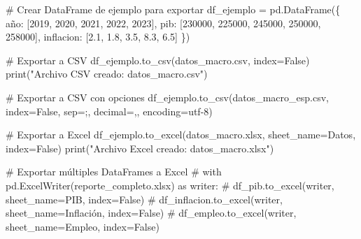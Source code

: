 \documentclass[
  doc,
  floatsintext,
  longtable,
  a4paper,
  nolmodern,
  notxfonts,
  notimes,
  12pt,
  colorlinks=true,linkcolor=blue,citecolor=blue,urlcolor=blue]{apa7}
\newenvironment{Shaded}{\begin{snugshade}}{\end{snugshade}}
\newcommand{\BuiltInTok}[1]{\textcolor[rgb]{0.00,0.23,0.31}{#1}}
\newcommand{\CommentTok}[1]{\textcolor[rgb]{0.37,0.37,0.37}{#1}}
\newcommand{\DecValTok}[1]{\textcolor[rgb]{0.68,0.00,0.00}{#1}}
\newcommand{\FloatTok}[1]{\textcolor[rgb]{0.68,0.00,0.00}{#1}}
\newcommand{\NormalTok}[1]{\textcolor[rgb]{0.00,0.23,0.31}{#1}}
\newcommand{\OperatorTok}[1]{\textcolor[rgb]{0.37,0.37,0.37}{#1}}
\newcommand{\StringTok}[1]{\textcolor[rgb]{0.13,0.47,0.30}{#1}}
\newcommand{\VariableTok}[1]{\textcolor[rgb]{0.07,0.07,0.07}{#1}}
\begin{document}
\begin{Shaded}
\begin{Highlighting}[]
\CommentTok{\# Crear DataFrame de ejemplo para exportar}
\NormalTok{df\_ejemplo }\OperatorTok{=}\NormalTok{ pd.DataFrame(\{}
    \StringTok{\textquotesingle{}año\textquotesingle{}}\NormalTok{: [}\DecValTok{2019}\NormalTok{, }\DecValTok{2020}\NormalTok{, }\DecValTok{2021}\NormalTok{, }\DecValTok{2022}\NormalTok{, }\DecValTok{2023}\NormalTok{],}
    \StringTok{\textquotesingle{}pib\textquotesingle{}}\NormalTok{: [}\DecValTok{230000}\NormalTok{, }\DecValTok{225000}\NormalTok{, }\DecValTok{245000}\NormalTok{, }\DecValTok{250000}\NormalTok{, }\DecValTok{258000}\NormalTok{],}
    \StringTok{\textquotesingle{}inflacion\textquotesingle{}}\NormalTok{: [}\FloatTok{2.1}\NormalTok{, }\FloatTok{1.8}\NormalTok{, }\FloatTok{3.5}\NormalTok{, }\FloatTok{8.3}\NormalTok{, }\FloatTok{6.5}\NormalTok{]}
\NormalTok{\})}

\CommentTok{\# Exportar a CSV}
\NormalTok{df\_ejemplo.to\_csv(}\StringTok{\textquotesingle{}datos\_macro.csv\textquotesingle{}}\NormalTok{, index}\OperatorTok{=}\VariableTok{False}\NormalTok{)}
\BuiltInTok{print}\NormalTok{(}\StringTok{"Archivo CSV creado: datos\_macro.csv"}\NormalTok{)}

\CommentTok{\# Exportar a CSV con opciones}
\NormalTok{df\_ejemplo.to\_csv(}\StringTok{\textquotesingle{}datos\_macro\_esp.csv\textquotesingle{}}\NormalTok{, }
\NormalTok{                  index}\OperatorTok{=}\VariableTok{False}\NormalTok{,}
\NormalTok{                  sep}\OperatorTok{=}\StringTok{\textquotesingle{};\textquotesingle{}}\NormalTok{,}
\NormalTok{                  decimal}\OperatorTok{=}\StringTok{\textquotesingle{},\textquotesingle{}}\NormalTok{,}
\NormalTok{                  encoding}\OperatorTok{=}\StringTok{\textquotesingle{}utf{-}8\textquotesingle{}}\NormalTok{)}

\CommentTok{\# Exportar a Excel}
\NormalTok{df\_ejemplo.to\_excel(}\StringTok{\textquotesingle{}datos\_macro.xlsx\textquotesingle{}}\NormalTok{, }
\NormalTok{                    sheet\_name}\OperatorTok{=}\StringTok{\textquotesingle{}Datos\textquotesingle{}}\NormalTok{,}
\NormalTok{                    index}\OperatorTok{=}\VariableTok{False}\NormalTok{)}
\BuiltInTok{print}\NormalTok{(}\StringTok{"Archivo Excel creado: datos\_macro.xlsx"}\NormalTok{)}

\CommentTok{\# Exportar múltiples DataFrames a Excel}
\CommentTok{\# with pd.ExcelWriter(\textquotesingle{}reporte\_completo.xlsx\textquotesingle{}) as writer:}
\CommentTok{\#     df\_pib.to\_excel(writer, sheet\_name=\textquotesingle{}PIB\textquotesingle{}, index=False)}
\CommentTok{\#     df\_inflacion.to\_excel(writer, sheet\_name=\textquotesingle{}Inflación\textquotesingle{}, index=False)}
\CommentTok{\#     df\_empleo.to\_excel(writer, sheet\_name=\textquotesingle{}Empleo\textquotesingle{}, index=False)}
\end{Highlighting}
\end{Shaded}
\end{document}
